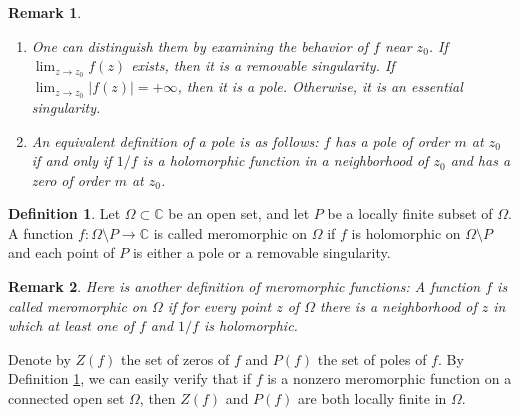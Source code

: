 \documentclass{article}
\newtheorem*{remark}{Remark}
\theoremstyle{definition}
\newtheorem{definition}[theorem]{Definition}
\newcommand{\C}{\mathbb{C}}
\begin{document}
\begin{remark}
    \begin{enumerate}
        \item One can distinguish them by examining the behavior of $f$ near $z_0$. If $\lim_{z\to z_0} f(z)$ exists, then it is a removable singularity. If $\lim_{z\to z_0} |f(z)| = +\infty$, then it is a pole. Otherwise, it is an essential singularity.   
        \item An equivalent definition of a pole is as follows: \(f\) has a pole of order \(m\) at $z_0$ if and only if $1/f$ is a holomorphic function in a neighborhood of $z_0$ and has a zero of order \(m\) at $z_0$.
    \end{enumerate}
\end{remark}

\begin{definition}\label{meromorphic}
    Let \(\Omega\subset\C\) be an open set, and let \(P\) be a locally finite subset of \(\Omega\). A function \(f\colon\Omega\setminus P\to\C\) is called meromorphic on \(\Omega\) if \(f\) is holomorphic on \(\Omega\setminus P\) and each point of \(P\) is either a pole or a removable singularity.
\end{definition}
\begin{remark}
    Here is another definition of meromorphic functions: A function \(f\) is called meromorphic on \(\Omega\) if for every point $z$ of $\Omega$ there is a neighborhood of $z$ in which at least one of $f$ and $1/f$ is holomorphic. 
\end{remark}
Denote by $Z(f)$ the set of zeros of $f$ and $P(f)$ the set of poles of $f$. By Definition \ref{meromorphic}, we can easily verify that if $f$ is a nonzero meromorphic function on a connected open set $\Omega$, then $Z(f)$ and $P(f)$ are both locally finite in $\Omega$. 
\end{document}
